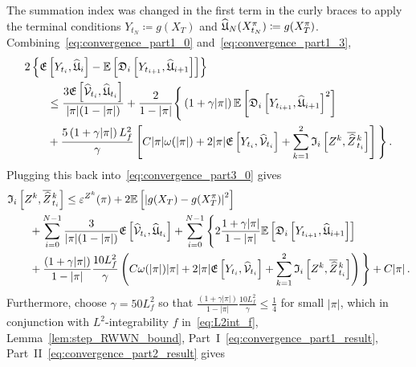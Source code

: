 The summation index was changed in the first term in the curly braces to apply the terminal conditions $Y_{t_N}\coloneqq g(X_T)$ and $\widehat{\mathfrak{U}}_N(X^\pi_{t_N})\coloneqq g(X^\pi_T)$.
Combining~\eqref{eq:convergence_part1_0} and~\eqref{eq:convergence_part1_3},
\begin{equation}
\begin{aligned}
& 2\left\{\mathfrak{E}\left[Y_{t_i}, \widehat{\mathfrak{U}}_{i}\right] - \mathbb{E}\left[\mathfrak{D}_i\left[Y_{t_{i+1}}, \widehat{\mathfrak{U}}_{i+1}\right]\right]\right\} \\
& \qquad\leq \frac{3 \mathfrak{E}\left[\widehat{\mathcal{V}}_{t_i}, \widehat{\mathfrak{U}}_{t_i}\right]}{|\pi|(1-|\pi|)} + \frac{2}{1-|\pi|}\Bigg\{\left(1+\gamma |\pi|\right) \mathbb{E}\left[\mathfrak{D}_i\left[Y_{t_{i+1}}, \widehat{\mathfrak{U}}_{i+1}\right]^{2}\right] \\ 
& \qquad + \frac{5\left(1+\gamma |\pi|\right) L_f^2}{\gamma}\left[C |\pi|\omega(|\pi|) +2|\pi| \mathfrak{E}\left[Y_{t_i}, \widehat{\mathcal{V}}_{t_i}\right] + \sum_{k=1}^{2}\mathfrak{I}_i\left[Z^k, \overline{\widehat{Z}}\kern0.1em^{k}_{t_i}\right]\right]\Bigg\}\,.
\end{aligned}
\end{equation}
Plugging this back into~\eqref{eq:convergence_part3_0} gives
\begin{equation}
\begin{aligned}
&\mathfrak{I}_i\left[Z^k, \overline{\widehat{Z}}\kern0.1em^{k}_{t_i}\right] \leq \varepsilon^{Z^k}(\pi) + 2\mathbb{E}\left[\left|g(X_T)-g(X^\pi_T)\right|^2\right] \\ 
& \qquad + \sum_{i=0}^{N-1} \frac{3}{|\pi|(1-|\pi|)} \mathfrak{E}\left[\widehat{\mathcal{V}}_{t_i}, \widehat{\mathfrak{U}}_{t_i}\right] +
\sum_{i=0}^{N-1}\Bigg\{2\frac{1+\gamma |\pi|}{1-|\pi|} \mathbb{E}\left[\mathfrak{D}_i\left[Y_{t_{i+1}}, \widehat{\mathfrak{U}}_{i+1}\right]\right] \\ 
& \qquad + \frac{\left(1+\gamma |\pi|\right)}{1-|\pi|} \frac{10 L_f^2}{\gamma}\left(C \omega(|\pi|)|\pi| +2|\pi| \mathfrak{E}\left[Y_{t_i}, \widehat{\mathcal{V}}_{t_i}\right] + \sum_{k=1}^{2}\mathfrak{I}_i\left[Z^k, \overline{\widehat{Z}}\kern0.1em^{k}_{t_i}\right]\right)\Bigg\} + C|\pi|\,.
\end{aligned}
\end{equation}
Furthermore, choose $\gamma=50L_f^2$ so that $\frac{\left(1+\gamma |\pi|\right)}{1-|\pi|} \frac{10 L_f^2}{\gamma}\leq\frac14$ for small $|\pi|$, which in conjunction with $L^2$-integrability $f$ in~\eqref{eq:L2int_f}, Lemma~\ref{lem:step_RWWN_bound}, Part~I~\eqref{eq:convergence_part1_result}, Part~II~\eqref{eq:convergence_part2_result} gives
